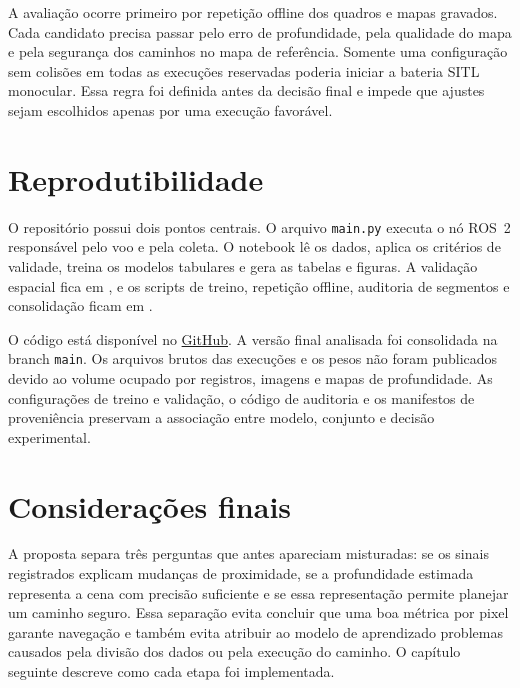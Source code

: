 A avaliação ocorre primeiro por repetição offline dos quadros e mapas gravados. Cada candidato precisa passar pelo erro de profundidade, pela qualidade do mapa e pela segurança dos caminhos no mapa de referência. Somente uma configuração sem colisões em todas as execuções reservadas poderia iniciar a bateria SITL monocular. Essa regra foi definida antes da decisão final e impede que ajustes sejam escolhidos apenas por uma execução favorável.

\section{Reprodutibilidade}

O repositório possui dois pontos centrais. O arquivo \texttt{main.py} executa o nó ROS~2 responsável pelo voo e pela coleta. O notebook  lê os dados, aplica os critérios de validade, treina os modelos tabulares e gera as tabelas e figuras. A validação espacial fica em , e os scripts de treino, repetição offline, auditoria de segmentos e consolidação ficam em .

O código está disponível no \href{https://github.com/Gabriel-Panza/TCC_Drone}{GitHub}. A versão final analisada foi consolidada na branch \texttt{main}. Os arquivos brutos das execuções e os pesos não foram publicados devido ao volume ocupado por registros, imagens e mapas de profundidade. As configurações de treino e validação, o código de auditoria e os manifestos de proveniência preservam a associação entre modelo, conjunto e decisão experimental.

\section{Considerações finais}

A proposta separa três perguntas que antes apareciam misturadas: se os sinais registrados explicam mudanças de proximidade, se a profundidade estimada representa a cena com precisão suficiente e se essa representação permite planejar um caminho seguro. Essa separação evita concluir que uma boa métrica por pixel garante navegação e também evita atribuir ao modelo de aprendizado problemas causados pela divisão dos dados ou pela execução do caminho. O capítulo seguinte descreve como cada etapa foi implementada.
